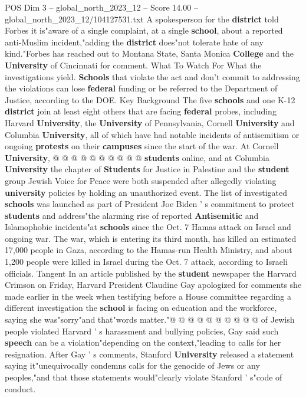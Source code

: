 \begin{textsample}{POS Dim 3 – global\_north\_2023\_12 – Score 14.00 – global\_north\_2023\_12/104127531.txt}
A spokesperson for the \textbf{district} told Forbes it is"aware of a single complaint, at a single \textbf{school}, about a reported anti-Muslim incident,"adding the \textbf{district} does"not tolerate hate of any kind."Forbes has reached out to Montana State, Santa Monica \textbf{College} and the \textbf{University} of Cincinnati for comment.
What To Watch For What the investigations yield. \textbf{Schools} that violate the act and don't commit to addressing the violations can lose \textbf{federal} funding or be referred to the Department of Justice, according to the DOE.
Key Background The five \textbf{schools} and one K-12 \textbf{district} join at least eight others that are facing \textbf{federal} probes, including Harvard \textbf{University}, the \textbf{University} of Pennsylvania, Cornell \textbf{University} and Columbia \textbf{University}, all of which have had notable incidents of antisemitism or ongoing \textbf{protests} on their \textbf{campuses} since the start of the war.
At Cornell \textbf{University}, @ @ @ @ @ @ @ @ @ @ \textbf{students} online, and at Columbia \textbf{University} the chapter of \textbf{Students} for Justice in Palestine and the \textbf{student} group Jewish Voice for Peace were both suspended after allegedly violating \textbf{university} policies by holding an unauthorized event.
The list of investigated \textbf{schools} was launched as part of President Joe Biden ' s commitment to protect \textbf{students} and address"the alarming rise of reported \textbf{Antisemitic} and Islamophobic incidents"at \textbf{schools} since the Oct. 7 Hamas attack on Israel and ongoing war.
The war, which is entering its third month, has killed an estimated 17,000 people in Gaza, according to the Hamas-run Health Ministry, and about 1,200 people were killed in Israel during the Oct. 7 attack, according to Israeli officials.
Tangent In an article published by the \textbf{student} newspaper the Harvard Crimson on Friday, Harvard President Claudine Gay apologized for comments she made earlier in the week when testifying before a House committee regarding a different investigation the \textbf{school} is facing on education and the workforce, saying she was"sorry"and that"words matter."@ @ @ @ @ @ @ @ @ @ of Jewish people violated Harvard ' s harassment and bullying policies, Gay said such \textbf{speech} can be a violation"depending on the context,"leading to calls for her resignation.
After Gay ' s comments, Stanford \textbf{University} released a statement saying it"unequivocally condemns calls for the genocide of Jews or any peoples,"and that those statements would"clearly violate Stanford ' s"code of conduct.

\end{textsample}
